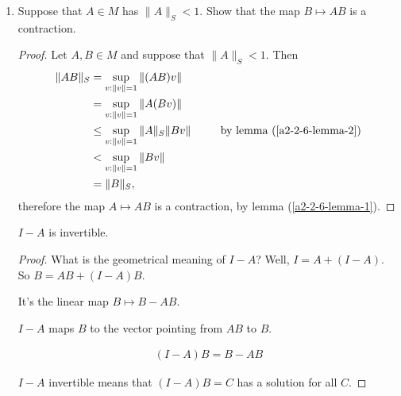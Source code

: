 \documentclass[12pt]{article}
\begin{document}
\begin{enumerate}[label=(\roman*)]
  \begin{proof}
    Let $v \in \R^n$. Then
    \begin{align*}
      \|Av\|
      =    \Bigg|\Bigg|A \frac{v}{\|v\|} \|v\| \Bigg|\Bigg|
      =    \Bigg|\Bigg|A \frac{v}{\|v\|} \Bigg|\Bigg| \cdot \|v\|
      \leq \|A\|_S \cdot \|v\|,
    \end{align*}
    since $\|\frac{v}{\|v\|}\| = 1$ and by definition $\|A\|_S = \sup_{u: \|u\| = 1} \|Au\|$.

  \end{proof}

\item

  \begin{claim*}
    Suppose that $A \in M$ has $\|A\|_S < 1$. Show that the map $B \mapsto AB$ is a
    contraction.
  \end{claim*}

  \begin{proof}
    Let $A, B \in M$ and suppose that $\|A\|_S < 1$. Then
    \begin{align*}
      \|AB\|_S
      &=    \sup_{v: \|v\| = 1} \|(AB)v\| \\
      &=    \sup_{v: \|v\| = 1} \|A(Bv)\| \\
      &\leq \sup_{v: \|v\| = 1} \|A\|_S \|Bv\| ~~~~~~~~\text{by lemma (\ref{a2-2-6-lemma-2})}\\
      &< \sup_{v: \|v\| = 1} \|Bv\| \\
      &= \|B\|_S,
    \end{align*}
    therefore the map $A \mapsto AB$ is a contraction, by lemma (\ref{a2-2-6-lemma-1}).
  \end{proof}

  \begin{claim*}
    $I - A$ is invertible.
  \end{claim*}


  \begin{proof}
    What is the geometrical meaning of $I - A$? Well, $I = A + (I - A)$. So $B = AB + (I - A)B$.

    It's the linear map $B \mapsto B - AB$.

    $I - A$ maps $B$ to the vector pointing from $AB$ to $B$.

    \begin{align*}
      (I - A)B = B - AB
    \end{align*}


    $I - A$ invertible means that $(I - A)B = C$ has a solution for all $C$.
  \end{proof}


\end{enumerate}
\end{document}
